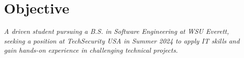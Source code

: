\section{Objective}
\textit{A driven student pursuing a B.S. in Software Engineering at WSU Everett, seeking a position at TechSecurity USA in Summer 2024 to apply IT skills and gain hands-on experience in challenging technical projects. \\}
